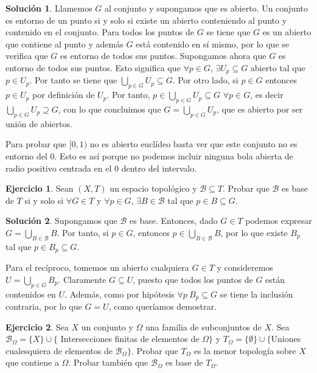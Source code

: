 \documentclass{article}
\theoremstyle{plain}
\theoremstyle{definition}
\newtheorem{exercise}{Ejercicio}
\newtheorem*{sol*}{Solución}
\begin{document}
\begin{sol*}
Llamemos $G$ al conjunto y supongamos que es abierto. Un conjunto es entorno de un punto si y solo si existe un abierto conteniendo al punto y contenido en el conjunto. Para todos los puntos de $G$ se tiene que $G$ es un abierto que contiene al punto y además $G$ está contenido en sí mismo, por lo que se verifica que $G$ es entorno de todos sus puntos. Supongamos ahora que $G$ es entorno de todos sus puntos. Esto significa que $\forall p\in G$, $\exists U_p\subseteq G$ abierto tal que $p\in U_p$. Por tanto se tiene que $\bigcup_{p\in G} U_p\subseteq G$. Por otro lado, si $p\in G$ entonces $p\in U_p$ por definición de $U_p$. Por tanto, $p\in \bigcup_{p\in G} U_p\subseteq G$ $\forall p\in G$, es decir $\bigcup_{p\in G} U_p\supseteq G$, con lo que concluimos que $G=\bigcup_{p\in G} U_p$, que es abierto por ser unión de abiertos.

Para probar que $[0,1)$ no es abierto euclídeo basta ver que este conjunto no es entorno del $0$. Esto es así porque no podemos incluir ninguna bola abierta de radio positivo centrada en el $0$ dentro del intervalo.
\end{sol*}

\begin{exercise}
Sean $(X,T)$ un espacio topológico y $\mathcal{B}\subseteq T$. Probar que $\mathcal{B}$ es base de $T$ si y solo si $\forall G\in T$ y $\forall p\in G$, $\exists B\in\mathcal{B}$ tal que $p\in B\subseteq G$. 
\end{exercise}

\begin{sol*}
Supongamos que $\mathcal{B}$ es base. Entonces, dado $G\in T$ podemos expresar $G=\bigcup_{B\in\mathcal{B}} B$. Por tanto, si $p\in G$, entonces $p\in\bigcup_{B\in\mathcal{B}}B$, por lo que existe $B_p$ tal que $p\in B_p\subseteq G$. 

Para el recíproco, tomemos un abierto cualquiera $G\in T$ y consideremos $U=\bigcup_{p\in G} B_p$. Claramente $G\subseteq U$, puesto que todos los puntos de $G$ están contenidos en $U$. Además, como por hipótesis $\forall p\ B_p\subseteq G$ se tiene la inclusión contraria, por lo que $G=U$, como queríamos demostrar.
\end{sol*}

\begin{exercise}
Sea $X$ un conjunto y $\Omega$ una familia de subconjuntos de $X$. Sea $\mathcal{B}_\Omega=\{X\}\cup\{$ Intersecciones finitas de elementos de $\Omega\}$ y $T_\Omega=\{\emptyset\}\cup\{$Uniones cualesquiera de elementos de $\mathcal{B}_\Omega\}$. Probar que $T_\Omega$ es la menor topología sobre $X$ que contiene a $\Omega$. Probar también que $\mathcal{B}_\Omega$ es base de $T_\Omega$.
\end{exercise}
\end{document}
